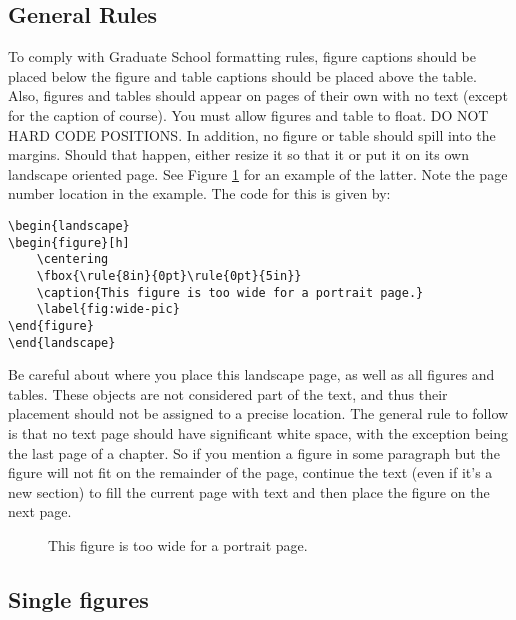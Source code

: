 \subsection{General Rules}
To comply with Graduate School formatting rules, 
figure captions should be placed below the figure and table captions should be placed above the table. Also, figures and tables should appear on pages of their own with no text (except for the caption of course). You must allow figures and table to float. DO NOT HARD CODE POSITIONS. In addition, no figure or table should spill into the margins. Should that happen, either resize it so that it or put it on its own landscape oriented page. See Figure \ref{fig:wide-pic} for an example of the latter. Note the page number location in the example. The code for this is given by:

\begin{verbatim}
\begin{landscape}
\begin{figure}[h]
    \centering
    \fbox{\rule{8in}{0pt}\rule{0pt}{5in}}
    \caption{This figure is too wide for a portrait page.}
    \label{fig:wide-pic}
\end{figure}
\end{landscape}
\end{verbatim}

Be careful about where you place this landscape page, as well as all figures and tables. These objects are not considered part of the text, and thus their placement should not be assigned to a precise location. The general rule to follow is that no text page should have significant white space, with the exception being the last page of a chapter. So if you mention a figure in some paragraph but the figure will not fit on the remainder of the page, continue the text (even if it's a new section) to fill the current page with text and then place the figure on the next page. 


\begin{landscape}
	\begin{figure}[p]
		\centering
	    \fbox{\rule{8in}{0pt}\rule{0pt}{5in}}
		\caption{This figure is too wide for a portrait page.}
		\label{fig:wide-pic}
	\end{figure}
\end{landscape}

\subsection{Single figures}

